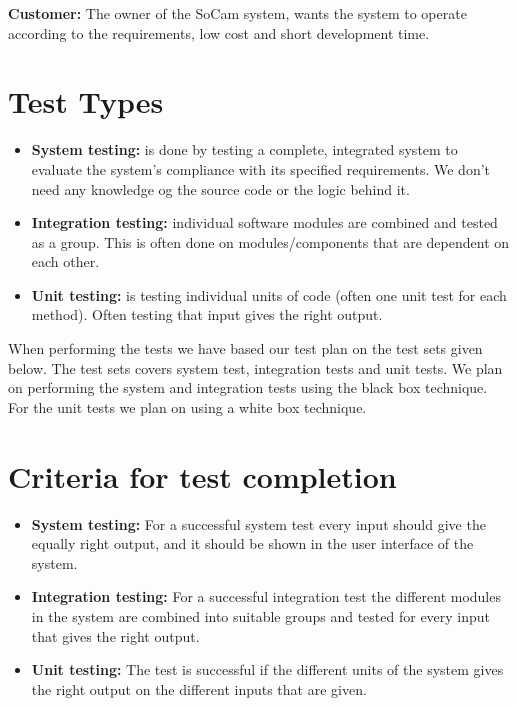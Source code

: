 		{\bf Customer:} The owner of the SoCam system, wants the system to operate according to the requirements, low cost and short development time.


	\section {Test Types}

		\begin{itemize}
			\item {\bf System testing:} is done by testing a complete, integrated system to 
			evaluate the system's compliance with its specified requirements. We don’t need 
			any knowledge og the source code or the logic behind it.
			\item {\bf Integration testing:} individual software modules are combined and tested as a group. 
			This is often done on modules/components that are dependent on each other. 
			\item {\bf Unit testing:} is testing individual units of code (often one unit test for each method). 
			Often testing that input gives the right output. 
		\end{itemize}

	When performing the tests we have based our test plan on the test sets given below. The test sets covers system test, integration tests and unit tests. We plan on performing the system and integration tests using the black box technique. For the unit tests we plan on using a white box technique. 

	\section{Criteria for test completion}

		\begin{itemize}
			\item {\bf System testing:} For a successful system test every input should give the equally right 
			output, and it should be shown in the user interface of the system. 
			\item {\bf Integration testing:} For a successful integration test the different modules in the 
			system are combined into suitable groups and tested for every input that gives the right output.  
			\item {\bf Unit testing:} The test is successful if the different units of the system gives the 
			right output on the different inputs that are given. 
		\end{itemize}

